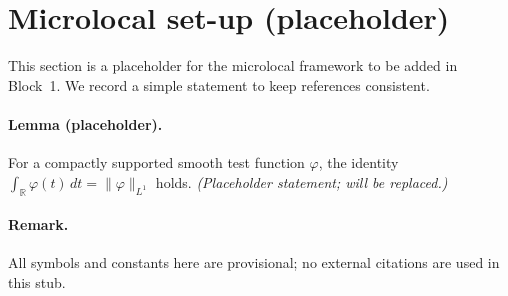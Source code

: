 \section{Microlocal set-up (placeholder)}
\label{sec:microlocal}
This section is a placeholder for the microlocal framework to be added in Block~1.
We record a simple statement to keep references consistent.

\paragraph{Lemma (placeholder).}
\label{lem:time-local}
For a compactly supported smooth test function $\varphi$, the identity
$\int_{\mathbb{R}} \varphi(t)\,dt = \|\varphi\|_{L^1}$ holds. \emph{(Placeholder statement; will be replaced.)}

\paragraph{Remark.}
All symbols and constants here are provisional; no external citations are used in this stub.
